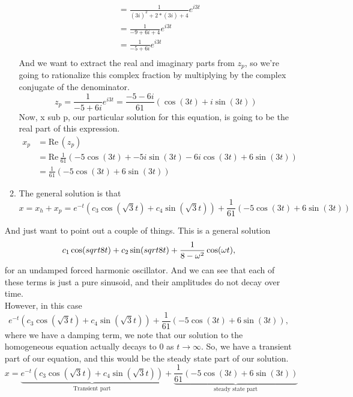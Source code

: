\begin{enumerate}[label=\textbf{Part.\arabic*}]
\begin{enumerate}[label=Step.\arabic*]
\begin{align*}
            &= \frac{1}{(3i)^2 + 2*(3i) + 4} e^{i3t} \\
            &= \frac{1}{-9 + 6i + 4} e^{i3t}\\
            &= \frac{1}{-5 + 6i} e^{i3t}\\
    \end{align*}
    And we want to extract the real and imaginary parts from $z_ p$,
    so we're going to rationalize this complex fraction
    by multiplying by the complex conjugate of the denominator.
    \begin{equation*}
      z_ p = \frac{1}{-5 + 6i} e^{i3t} = \frac{-5 - 6i}{61} \left( \cos (3t) + i \sin(3t) \right)
    \end{equation*}
    Now, x sub p, our particular solution for this equation,
    is going to be the real part of this expression.
    \begin{align*}
            x_ p &= \mathrm{Re\, }(z_ p) \\
                 &= \mathrm{Re\, } \frac{1}{61} \left( -5 \cos (3t) + - 5 i \sin (3t)  -6i \cos (3t)
        + 6 \sin (3t) \right) \\
                 &= \frac{1}{61} \left( -5 \cos (3t) + 6 \sin (3t) \right) 
    \end{align*}
  \item The general solution is that
    \begin{equation*}
      x = x_ h + x_ p = e^{-t} \left( c_ 3 \cos (\sqrt{3} t ) +  c_ 4 \sin (\sqrt{3} t )\right)
      + \frac{1}{61} \left( -5 \cos (3t) + 6 \sin (3t) \right) 
    \end{equation*}
  \end{enumerate}
  And just want to point out a couple of things.
  This is a general solution
  \begin{equation*}
    c_1 \cos (\\sqrt{8}t) + c_2 \sin (\\sqrt{8}t) + \frac{1}{8 - \omega ^2} \cos (\omega t), 
  \end{equation*}
  for an undamped forced harmonic oscillator.
  And we can see that each of these terms is just a pure sinusoid,
  and their amplitudes do not decay over time.\\  
  However, in this case
  \begin{equation*}
    e^{-t} \left( c_ 3 \cos (\sqrt{3} t ) +  c_ 4 \sin (\sqrt{3} t )\right)
    + \frac{1}{61} \left( -5 \cos (3t) + 6 \sin (3t) \right), 
  \end{equation*}
  where we have a damping term, we note that our solution to the homogeneous equation
  actually decays to $0$ as $t \to \infty$. 
  So, we have a transient part of our equation,
  and this would be the steady state part of our solution.
  \begin{equation*}
    x = \underbrace{e^{-t} \left( c_ 3 \cos (\sqrt{3} t ) +  c_ 4 \sin (\sqrt{3} t )\right)}
    _{\text{Transient part}}
    + \underbrace{\frac{1}{61} \left( -5 \cos (3t) + 6 \sin (3t) \right) }
    _{\text{steady state part}}
  \end{equation*}
\end{enumerate}

